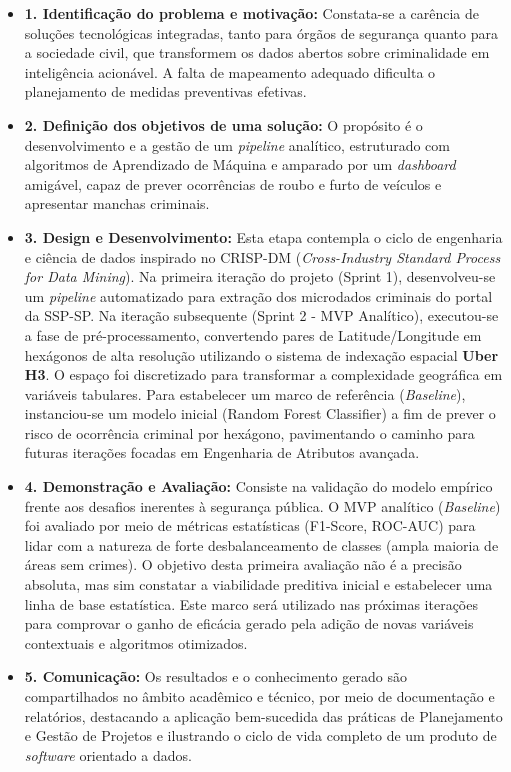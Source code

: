 \documentclass[12pt]{article}
\begin{document}
\begin{itemize}
    \item \textbf{1. Identificação do problema e motivação:} Constata-se a carência de soluções tecnológicas integradas, tanto para órgãos de segurança quanto para a sociedade civil, que transformem os dados abertos sobre criminalidade em inteligência acionável. A falta de mapeamento adequado dificulta o planejamento de medidas preventivas efetivas.
    
    \item \textbf{2. Definição dos objetivos de uma solução:} O propósito é o desenvolvimento e a gestão de um \textit{pipeline} analítico, estruturado com algoritmos de Aprendizado de Máquina e amparado por um \textit{dashboard} amigável, capaz de prever ocorrências de roubo e furto de veículos e apresentar manchas criminais.
    
    \item \textbf{3. Design e Desenvolvimento:} Esta etapa contempla o ciclo de engenharia e ciência de dados inspirado no CRISP-DM (\textit{Cross-Industry Standard Process for Data Mining}). Na primeira iteração do projeto (Sprint 1), desenvolveu-se um \textit{pipeline} automatizado para extração dos microdados criminais do portal da SSP-SP. Na iteração subsequente (Sprint 2 - MVP Analítico), executou-se a fase de pré-processamento, convertendo pares de Latitude/Longitude em hexágonos de alta resolução utilizando o sistema de indexação espacial \textbf{Uber H3}. O espaço foi discretizado para transformar a complexidade geográfica em variáveis tabulares. Para estabelecer um marco de referência (\textit{Baseline}), instanciou-se um modelo inicial (Random Forest Classifier) a fim de prever o risco de ocorrência criminal por hexágono, pavimentando o caminho para futuras iterações focadas em Engenharia de Atributos avançada.
    
    \item \textbf{4. Demonstração e Avaliação:} Consiste na validação do modelo empírico frente aos desafios inerentes à segurança pública. O MVP analítico (\textit{Baseline}) foi avaliado por meio de métricas estatísticas (F1-Score, ROC-AUC) para lidar com a natureza de forte desbalanceamento de classes (ampla maioria de áreas sem crimes). O objetivo desta primeira avaliação não é a precisão absoluta, mas sim constatar a viabilidade preditiva inicial e estabelecer uma linha de base estatística. Este marco será utilizado nas próximas iterações para comprovar o ganho de eficácia gerado pela adição de novas variáveis contextuais e algoritmos otimizados.
    
    \item \textbf{5. Comunicação:} Os resultados e o conhecimento gerado são compartilhados no âmbito acadêmico e técnico, por meio de documentação e relatórios, destacando a aplicação bem-sucedida das práticas de Planejamento e Gestão de Projetos e ilustrando o ciclo de vida completo de um produto de \textit{software} orientado a dados.
\end{itemize}
\end{document}
